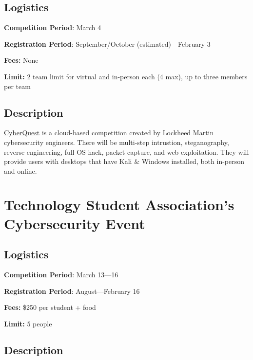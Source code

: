 \documentclass[
  letterpaper,
  DIV=11,
  numbers=noendperiod]{scrartcl}
\begin{document}
\hypertarget{logistics-6}{%
\subsection{Logistics}\label{logistics-6}}

\textbf{Competition Period}: March 4

\textbf{Registration Period}: September/October (estimated)---February 3

\textbf{Fees:} None

\textbf{Limit:} 2 team limit for virtual and in-person each (4 max), up
to three members per team

\hypertarget{description-6}{%
\subsection{Description}\label{description-6}}

\href{https://www.lockheedmartin.com/en-us/who-we-are/communities/cyber-quest.html}{CyberQuest}
is a cloud-based competition created by Lockheed Martin cybersecurity
engineers. There will be multi-step intrustion, steganography, reverse
engineering, full OS hack, packet capture, and web exploitation. They
will provide users with desktops that have Kali \& Windows installed,
both in-person and online.

\hypertarget{technology-student-associations-cybersecurity-event}{%
\section{Technology Student Association's Cybersecurity
Event}\label{technology-student-associations-cybersecurity-event}}

\hypertarget{logistics-7}{%
\subsection{Logistics}\label{logistics-7}}

\textbf{Competition Period}: March 13---16

\textbf{Registration Period}: August---February 16

\textbf{Fees:} \$250 per student + food

\textbf{Limit:} 5 people

\hypertarget{description-7}{%
\subsection{Description}\label{description-7}}
\end{document}
